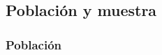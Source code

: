 \documentclass[12pt,a4paper]{article}
\begin{document}

%
%



\subsection{Población y muestra}

\subsubsection{Población}
\end{document}
